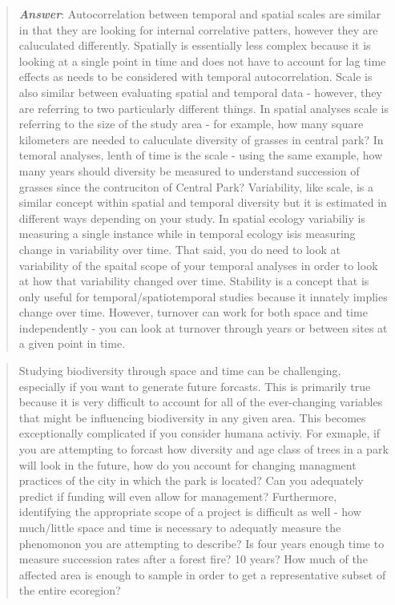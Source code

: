 \documentclass[]{article}
\begin{document}
\begin{quote}
\textbf{\emph{Answer}}: Autocorrelation between temporal and spatial
scales are similar in that they are looking for internal correlative
patters, however they are caluculated differently. Spatially is
essentially less complex because it is looking at a single point in time
and does not have to account for lag time effects as needs to be
considered with temporal autocorrelation. Scale is also similar between
evaluating spatial and temporal data - however, they are referring to
two particularly different things. In spatial analyses scale is
referring to the size of the study area - for example, how many square
kilometers are needed to caluculate diversity of grasses in central
park? In temoral analyses, lenth of time is the scale - using the same
example, how many years should diversity be measured to understand
succession of grasses since the contruciton of Central Park?
Variability, like scale, is a similar concept within spatial and
temporal diversity but it is estimated in different ways depending on
your study. In spatial ecology variabiliy is measuring a single instance
while in temporal ecology isis measuring change in variability over
time. That said, you do need to look at variability of the spaital scope
of your temporal analyses in order to look at how that variability
changed over time. Stability is a concept that is only useful for
temporal/spatiotemporal studies because it innately implies change over
time. However, turnover can work for both space and time independently -
you can look at turnover through years or between sites at a given point
in time.
\end{quote}

\begin{quote}
Studying biodiversity through space and time can be challenging,
especially if you want to generate future forcasts. This is primarily
true because it is very difficult to account for all of the
ever-changing variables that might be influencing biodiversity in any
given area. This becomes exceptionally complicated if you consider
humana activiy. For exmaple, if you are attempting to forcast how
diversity and age class of trees in a park will look in the future, how
do you account for changing managment practices of the city in which the
park is located? Can you adequately predict if funding will even allow
for management? Furthermore, identifying the appropriate scope of a
project is difficult as well - how much/little space and time is
necessary to adequatly measure the phenomonon you are attempting to
describe? Is four years enough time to measure succession rates after a
forest fire? 10 years? How much of the affected area is enough to sample
in order to get a representative subset of the entire ecoregion?
\end{quote}
\end{document}
